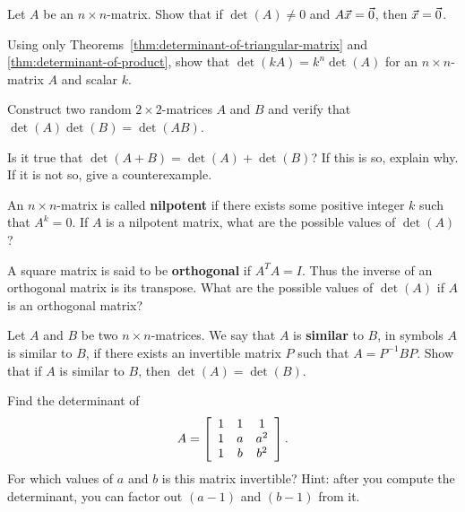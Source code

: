\documentclass{ximera}
\begin{document}
\begin{example}
  \label{ex:determinant3}
  Let $A$ be an $n\times n$-matrix. Show that if $\det(A) \neq 0$ and
  $A\vect{x}=\vect{0}$, then $\vect{x}=\vect{0}$.
\end{example}

\begin{example}
  Using only Theorems~\ref{thm:determinant-of-triangular-matrix} and
  {\ref{thm:determinant-of-product}}, show that
  $\det(kA) = k^n\det(A)$ for an $n\times n$-matrix $A$ and scalar
  $k$.
\end{example}

\begin{example}
  Construct two random $2\times 2$-matrices $A$ and $B$ and verify
  that $\det(A)\det(B) = \det(AB)$.
\end{example}


\begin{example}
  Is it true that $\det(A+B) = \det(A) + \det(B)$? If this is so,
  explain why. If it is not so, give a counterexample.
\end{example}

\begin{example}
  An $n\times n$-matrix is called \textbf{nilpotent}%
   if there exists some positive integer $k$
  such that $A^k = 0$. If $A$ is a nilpotent matrix, what are the
  possible values of $\det(A)$?
\end{example}

\begin{example}
  A square matrix is said to be \textbf{orthogonal}%
   if $A^TA = I$. Thus the inverse of an
  orthogonal matrix is its transpose. What are the possible values of
  $\det(A)$ if $A$ is an orthogonal matrix?
\end{example}



\begin{example}
  Let $A$ and $B$ be two $n\times n$-matrices. We say that $A$ is
  \textbf{similar}%
   to $B$, in symbols $A$ is similar to $B$, if there
  exists an invertible matrix $P$ such that $A = P^{-1}BP$. Show that
  if $A$ is similar to $B$, then $\det(A) = \det(B)$.
\end{example}


\begin{example}
  Find the determinant of
  \begin{equation*}
    A = \startmat{ccc}
      1 & 1 & 1 \\
      1 & a & a^2 \\
      1 & b & b^2 \\
    \stopmat.
  \end{equation*}
  For which values of $a$ and $b$ is this matrix invertible? Hint:
  after you compute the determinant, you can factor out $(a-1)$ and
  $(b-1)$ from it.
\end{example}
\end{document}
